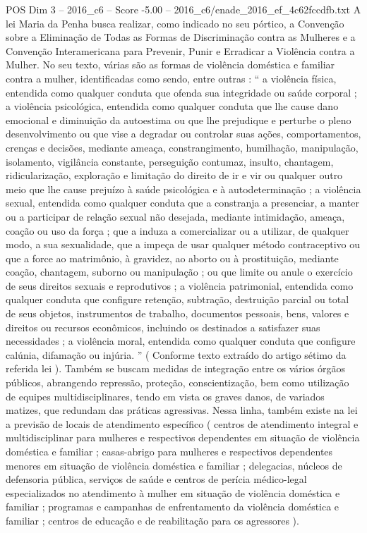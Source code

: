 \begin{textsample}{POS Dim 3 – 2016\_c6 – Score -5.00 – 2016\_c6/enade\_2016\_ef\_4c62fccdfb.txt}
A lei Maria da Penha busca realizar, como indicado no seu pórtico, a Convenção sobre a Eliminação de Todas as Formas de Discriminação contra as Mulheres e a Convenção Interamericana para Prevenir, Punir e Erradicar a Violência contra a Mulher.
No seu texto, várias são as formas de violência doméstica e familiar contra a mulher, identificadas como sendo, entre outras : “ a violência física, entendida como qualquer conduta que ofenda sua integridade ou saúde corporal ; a violência psicológica, entendida como qualquer conduta que lhe cause dano emocional e diminuição da autoestima ou que lhe prejudique e perturbe o pleno desenvolvimento ou que vise a degradar ou controlar suas ações, comportamentos, crenças e decisões, mediante ameaça, constrangimento, humilhação, manipulação, isolamento, vigilância constante, perseguição contumaz, insulto, chantagem, ridicularização, exploração e limitação do direito de ir e vir ou qualquer outro meio que lhe cause prejuízo à saúde psicológica e à autodeterminação ; a violência sexual, entendida como qualquer conduta que a constranja a presenciar, a manter ou a participar de relação sexual não desejada, mediante intimidação, ameaça, coação ou uso da força ; que a induza a comercializar ou a utilizar, de qualquer modo, a sua sexualidade, que a impeça de usar qualquer método contraceptivo ou que a force ao matrimônio, à gravidez, ao aborto ou à prostituição, mediante coação, chantagem, suborno ou manipulação ; ou que limite ou anule o exercício de seus direitos sexuais e reprodutivos ; a violência patrimonial, entendida como qualquer conduta que configure retenção, subtração, destruição parcial ou total de seus objetos, instrumentos de trabalho, documentos pessoais, bens, valores e direitos ou recursos econômicos, incluindo os destinados a satisfazer suas necessidades ; a violência moral, entendida como qualquer conduta que configure calúnia, difamação ou injúria. ” ( Conforme texto extraído do artigo sétimo da referida lei ).
Também se buscam medidas de integração entre os vários órgãos públicos, abrangendo repressão, proteção, conscientização, bem como utilização de equipes multidisciplinares, tendo em vista os graves danos, de variados matizes, que redundam das práticas agressivas.
Nessa linha, também existe na lei a previsão de locais de atendimento específico ( centros de atendimento integral e multidisciplinar para mulheres e respectivos dependentes em situação de violência doméstica e familiar ; casas-abrigo para mulheres e respectivos dependentes menores em situação de violência doméstica e familiar ; delegacias, núcleos de defensoria pública, serviços de saúde e centros de perícia médico-legal especializados no atendimento à mulher em situação de violência doméstica e familiar ; programas e campanhas de enfrentamento da violência doméstica e familiar ; centros de educação e de reabilitação para os agressores ).

\end{textsample}

